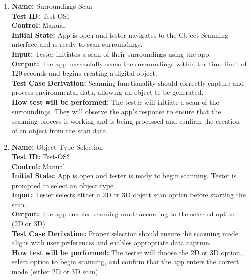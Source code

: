 \documentclass[12pt, titlepage]{article}
\begin{document}
\begin{enumerate}

  \item \textbf{Name:} Surroundings Scan \label{itm:Test-OS1} \\
  \textbf{Test ID:} Test-OS1 \\
  \textbf{Control:} Manual \\
  \textbf{Initial State:} App is open and tester navigates to the Object Scanning interface and is ready to scan surroundings. \\
  \textbf{Input:} Tester initiates a scan of their surroundings using the app. \\
  \textbf{Output:} The app successfully scans the surroundings within the time limit of 120 seconds and begins creating a digital object. \\
  \textbf{Test Case Derivation:} Scanning functionality should correctly capture and process environmental data, allowing an object to be generated. \\
  \textbf{How test will be performed:} The tester will initiate a scan of the surroundings. They will observe the app's response to ensure that the scanning process is working and is being processed and confirm the creation of an object from the scan data.

  \item \textbf{Name:} Object Type Selection \label{itm:Test-OS2} \\
  \textbf{Test ID:} Test-OS2 \\
  \textbf{Control:} Manual \\
  \textbf{Initial State:} App is open and tester is ready to begin scanning. Tester is prompted to select an object type. \\
  \textbf{Input:} Tester selects either a 2D or 3D object scan option before starting the scan. \\
  \textbf{Output:} The app enables scanning mode according to the selected option (2D or 3D). \\
  \textbf{Test Case Derivation:} Proper selection should ensure the scanning mode aligns with user preferences and enables appropriate data capture. \\
  \textbf{How test will be performed:} The tester will choose the 2D or 3D option, select option to begin scanning, and confirm that the app enters the correct mode (either 2D or 3D scan).


\end{enumerate}
\end{document}
